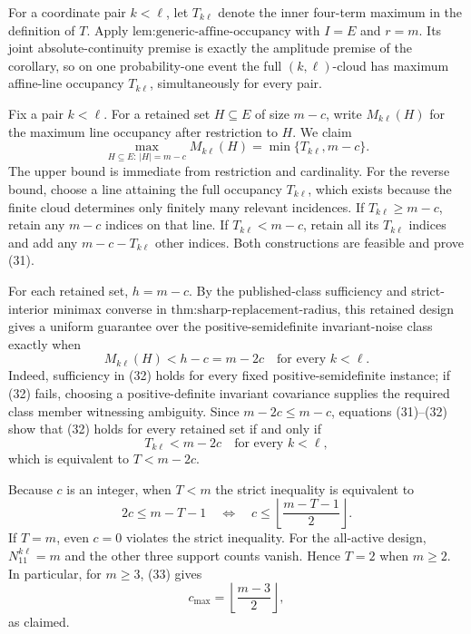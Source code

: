 For a coordinate pair \(k<\ell\), let \(T_{k\ell}\) denote the inner four-term maximum in the definition of \(T\).  Apply \(\text{lem:generic-affine-occupancy}\) with \(I=E\) and \(r=m\).  Its joint absolute-continuity premise is exactly the amplitude premise of the corollary, so on one probability-one event the full \((k,\ell)\)-cloud has maximum affine-line occupancy \(T_{k\ell}\), simultaneously for every pair.

Fix a pair \(k<\ell\).  For a retained set \(H\subseteq E\) of size \(m-c\), write \(M_{k\ell}(H)\) for the maximum line occupancy after restriction to \(H\).  We claim
\[
 \max_{H\subseteq E:\,|H|=m-c}M_{k\ell}(H)
 =\min\{T_{k\ell},m-c\}. \tag{31}
\]
The upper bound is immediate from restriction and cardinality.  For the reverse bound, choose a line attaining the full occupancy \(T_{k\ell}\), which exists because the finite cloud determines only finitely many relevant incidences.  If \(T_{k\ell}\ge m-c\), retain any \(m-c\) indices on that line.  If \(T_{k\ell}<m-c\), retain all its \(T_{k\ell}\) indices and add any \(m-c-T_{k\ell}\) other indices.  Both constructions are feasible and prove (31).

For each retained set, \(h=m-c\).  By the published-class sufficiency and strict-interior minimax converse in \(\text{thm:sharp-replacement-radius}\), this retained design gives a uniform guarantee over the positive-semidefinite invariant-noise class exactly when
\[
 M_{k\ell}(H)<h-c=m-2c
 \quad\text{for every }k<\ell. \tag{32}
\]
Indeed, sufficiency in (32) holds for every fixed positive-semidefinite instance; if (32) fails, choosing a positive-definite invariant covariance supplies the required class member witnessing ambiguity.  Since \(m-2c\le m-c\), equations (31)--(32) show that (32) holds for every retained set if and only if
\[
 T_{k\ell}<m-2c\quad\text{for every }k<\ell,
\]
which is equivalent to \(T<m-2c\).

Because \(c\) is an integer, when \(T<m\) the strict inequality is equivalent to
\[
 2c\le m-T-1
 \quad\Longleftrightarrow\quad
 c\le\left\lfloor\frac{m-T-1}{2}\right\rfloor. \tag{33}
\]
If \(T=m\), even \(c=0\) violates the strict inequality.  For the all-active design, \(N_{11}^{k\ell}=m\) and the other three support counts vanish.  Hence \(T=2\) when \(m\ge2\).  In particular, for \(m\ge3\), (33) gives
\[
 c_{\max}=\left\lfloor\frac{m-3}{2}\right\rfloor,
\]
as claimed.
